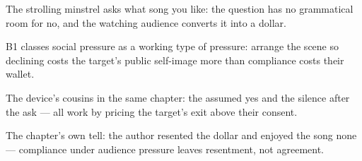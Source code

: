 

\begin{distilled}
  \item The strolling minstrel asks what song you like: the question has no grammatical room for no, and the watching audience converts it into a dollar.
  \item B1 classes social pressure as a working type of pressure: arrange the scene so declining costs the target's public self-image more than compliance costs their wallet.
  \item The device's cousins in the same chapter: the assumed yes and the silence after the ask --- all work by pricing the target's exit above their consent.
  \item The chapter's own tell: the author resented the dollar and enjoyed the song none --- compliance under audience pressure leaves resentment, not agreement.
\end{distilled}
